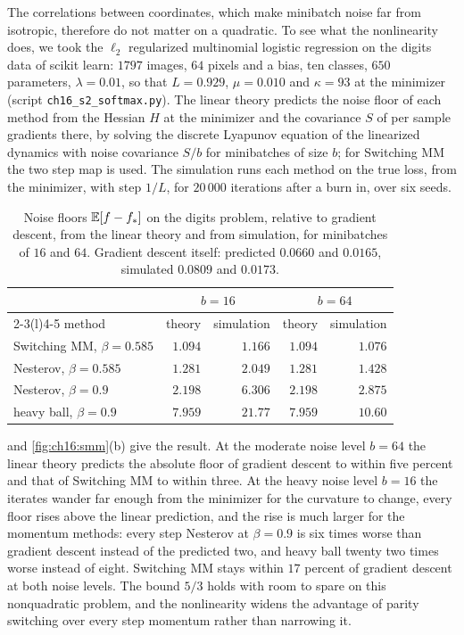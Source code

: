 The correlations between coordinates, which make minibatch noise far from
isotropic, therefore do not matter on a quadratic. To see what the
nonlinearity does, we took the $\ell_2$ regularized multinomial logistic
regression on the digits data of scikit learn: $1797$ images, $64$ pixels and a
bias, ten classes, $650$ parameters, $\lambda=0.01$, so that $L=0.929$, $\mu=0.010$
and $\kappa=93$ at the minimizer (script \texttt{ch16\_s2\_softmax.py}). The linear
theory predicts the noise floor of each method from the Hessian $H$ at the
minimizer and the covariance $S$ of per sample gradients there, by solving the
discrete Lyapunov equation of the linearized dynamics with noise covariance
$S/b$ for minibatches of size $b$; for Switching MM the two step map is used.
The simulation runs each method on the true loss, from the minimizer, with step
$1/L$, for $20\,000$ iterations after a burn in, over six seeds.

\begin{table}[t]
\centering\small
\setlength{\tabcolsep}{4pt}
\caption{Noise floors $\mathbb{E}[f-f_*]$ on the digits problem, relative to gradient
descent, from the linear theory and from simulation, for minibatches of $16$
and $64$. Gradient descent itself: predicted $0.0660$ and $0.0165$, simulated
$0.0809$ and $0.0173$.}
\label{tab:ch16:s2}
\begin{tabular}{@{}lrrrr@{}}
\toprule
 & \multicolumn{2}{c}{$b=16$} & \multicolumn{2}{c}{$b=64$} \\
\cmidrule(lr){2-3}\cmidrule(l){4-5}
method & theory & simulation & theory & simulation \\
\midrule
Switching MM, $\beta=0.585$ & $1.094$ & $1.166$ & $1.094$ & $1.076$ \\
Nesterov, $\beta=0.585$ & $1.281$ & $2.049$ & $1.281$ & $1.428$ \\
Nesterov, $\beta=0.9$ & $2.198$ & $6.306$ & $2.198$ & $2.875$ \\
heavy ball, $\beta=0.9$ & $7.959$ & $21.77$ & $7.959$ & $10.60$ \\
\bottomrule
\end{tabular}
\end{table}

 and \cref{fig:ch16:smm}(b) give the result. At the
moderate noise level $b=64$ the linear theory predicts the absolute floor of
gradient descent to within five percent and that of Switching MM to within
three. At the heavy noise level $b=16$ the iterates wander far enough from the
minimizer for the curvature to change, every floor rises above the linear
prediction, and the rise is much larger for the momentum methods: every step
Nesterov at $\beta=0.9$ is six times worse than gradient descent instead of the
predicted two, and heavy ball twenty two times worse instead of eight.
Switching MM stays within $17$ percent of gradient descent at both noise
levels. The bound $5/3$ holds with room to spare on this nonquadratic problem,
and the nonlinearity widens the advantage of parity switching over every step
momentum rather than narrowing it.

